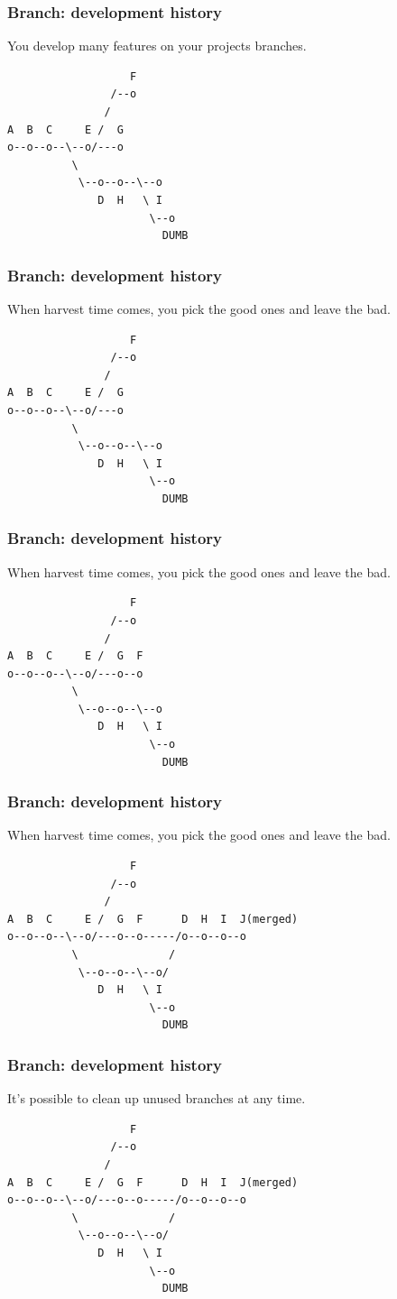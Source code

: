 \documentclass[unknownkeysallowed]{beamer}
\begin{document}
\begin{frame}[fragile]
	\frametitle{Branch: development history}
	You develop many features on your projects branches.
\begin{verbatim}
                   F
                /--o
               /
A  B  C     E /  G
o--o--o--\--o/---o
          \            
           \--o--o--\--o
              D  H   \ I
                      \--o
                        DUMB
\end{verbatim}
\end{frame}

\begin{frame}[fragile]
	\frametitle{Branch: development history}
	When harvest time comes, you pick the good ones and leave the bad.
\begin{verbatim}
                   F
                /--o
               /
A  B  C     E /  G
o--o--o--\--o/---o
          \            
           \--o--o--\--o
              D  H   \ I
                      \--o
                        DUMB
\end{verbatim}
\end{frame}

\begin{frame}[fragile]
	\frametitle{Branch: development history}
	When harvest time comes, you pick the good ones and leave the bad.
\begin{verbatim}
                   F
                /--o
               /
A  B  C     E /  G  F
o--o--o--\--o/---o--o
          \            
           \--o--o--\--o
              D  H   \ I
                      \--o
                        DUMB
\end{verbatim}
\end{frame}

\begin{frame}[fragile]
	\frametitle{Branch: development history}
	When harvest time comes, you pick the good ones and leave the bad.
\begin{verbatim}
                   F
                /--o
               /
A  B  C     E /  G  F      D  H  I  J(merged)
o--o--o--\--o/---o--o-----/o--o--o--o
          \              /
           \--o--o--\--o/
              D  H   \ I
                      \--o
                        DUMB
\end{verbatim}
\end{frame}

\begin{frame}[fragile]
	\frametitle{Branch: development history}
	It's possible to clean up unused branches at any time.
\begin{verbatim}
                   F
                /--o
               /
A  B  C     E /  G  F      D  H  I  J(merged)
o--o--o--\--o/---o--o-----/o--o--o--o
          \              /
           \--o--o--\--o/
              D  H   \ I
                      \--o
                        DUMB
\end{verbatim}
\end{frame}
\end{document}
